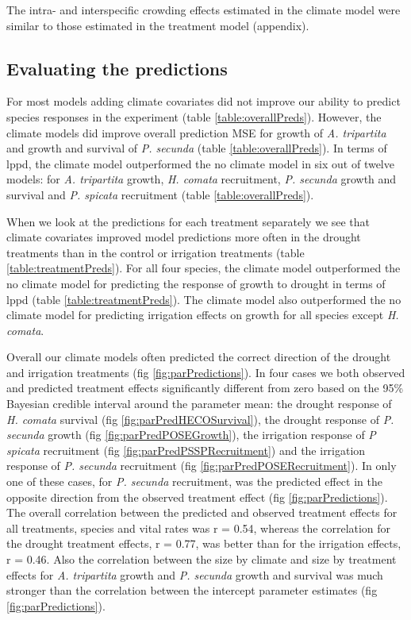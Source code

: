 \documentclass[11pt]{article}
\begin{document}
\begin{doublespacing}
The intra- and interspecific crowding effects estimated in the climate model were similar to those estimated in the treatment model (appendix).

\subsection*{Evaluating the predictions}

For most models adding climate covariates did not improve our ability to predict species responses in the experiment (table \ref{table:overallPreds}). However, the climate models did improve overall prediction MSE for growth of \textit{A. tripartita} and growth and survival of \textit{P. secunda} (table \ref{table:overallPreds}). In terms of lppd, the climate model outperformed the no climate model in six out of twelve models: for \textit{A. tripartita} growth, \textit{H. comata} recruitment, \textit{P. secunda} growth and survival and \textit{P. spicata} recruitment (table \ref{table:overallPreds}).

When we look at the predictions for each treatment separately we see that climate covariates improved model predictions more often in the drought treatments than in the control or irrigation treatments (table \ref{table:treatmentPreds}). For all four species, the climate model outperformed the no climate model for predicting the response of growth to drought in terms of lppd (table \ref{table:treatmentPreds}). The climate model also outperformed the no climate model for predicting irrigation effects on growth for all species except \textit{H. comata}. 

Overall our climate models often predicted the correct direction of the drought and irrigation treatments (fig \ref{fig:parPredictions}). In four cases we both observed and predicted treatment effects significantly different from zero based on the 95\% Bayesian credible interval around the parameter mean: the drought response of \textit{H. comata} survival (fig \ref{fig:parPredHECOSurvival}), the drought response of \textit{P. secunda} growth (fig \ref{fig:parPredPOSEGrowth}), the irrigation response of \textit{P spicata} recruitment (fig \ref{fig:parPredPSSPRecruitment}) and the irrigation response of \textit{P. secunda} recruitment (fig \ref{fig:parPredPOSERecruitment}).  In only one of these cases, for \textit{P. secunda} recruitment, was the predicted effect in the opposite direction from the observed treatment effect (fig \ref{fig:parPredictions}). The overall correlation between the predicted and observed treatment effects for all treatments, species and vital rates was r = 0.54, whereas the correlation for the drought treatment effects, r = 0.77, was better than for the irrigation effects, r = 0.46.  Also the correlation between the size by climate and size by treatment effects for \textit{A. tripartita} growth and \textit{P. secunda} growth and survival was much stronger than the correlation between the intercept parameter estimates (fig \ref{fig:parPredictions}).  


\end{doublespacing}
\end{document}
